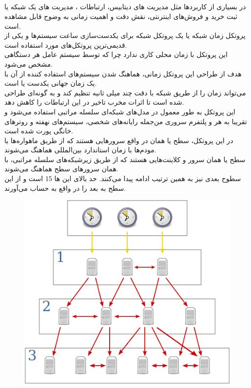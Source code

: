 \documentclass{article}
\begin{document}
\begin{multicols}{2}
\section{}
در بسیاری از کاربردها مثل مدیریت
های دیتابیس، ارتباطات
، مدیریت
های یک شبکه یا ثبت خرید و فروش‌های اینترنتی، نقش دقت و اهمیت زمانی به وضوح قابل مشاهده است.\\
پروتکل زمان شبکه یا
یک پروتکل شبکه برای یکدست‌سازی ساعت سیستم‌ها و یکی از قدیمی‌ترین پروتکل‌های مورد استفاده است.\\
این پروتکل با زمان محلی کاری ندارد چرا که
توسط سیستم عامل هر دستگاهی مشخص می‌شود.\\
هدف از طراحی این پروتکل زمانی، هماهنگ شدن سیستم‌های استفاده کننده از آن با یک زمان جهانی یکدست یا
است.\\
می‌تواند زمان را از طریق شبکه با دقت چند میلی ثانیه تنظیم کند و به گونه‌ای طراحی شده است تا اثرات مخرب تاخیر در این ارتباطات را کاهش دهد.\\
این پروتکل به طور معمول در مدل‌های شبکه‌ای سلسله مراتبی استفاده می‌شود و تقریبا به هر
و پلتفرم سروری من‌جمله رایانه‌های شخصی، سیستم‌های نهفته و روترهای خانگی پورت شده است.\\
در این پروتکل، سطح
یا همان
در واقع سرورهایی هستند که از طریق ماهواره‌ها یا مودم‌ها با زمان استاندارد بین‌المللی هماهنگ می‌شوند.\\
سطح
یا همان
سرور و کلاینت‌هایی هستند که از طریق زیرشبکه‌های سلسله مراتبی، با همان سرورهای سطح
هماهنگ می‌شوند.\\
سطوح بعدی نیز به همین ترتیب ادامه پیدا می‌کنند. حد بالای این
ها 15 است و از این سطح به بعد را در واقع
به حساب می‌آورند.
\begin{figure}[H]
    \centering
    \includegraphics[width=0.7\linewidth]{Photos/HW2/levels.png}

\end{figure}
\end{multicols}
\end{document}
